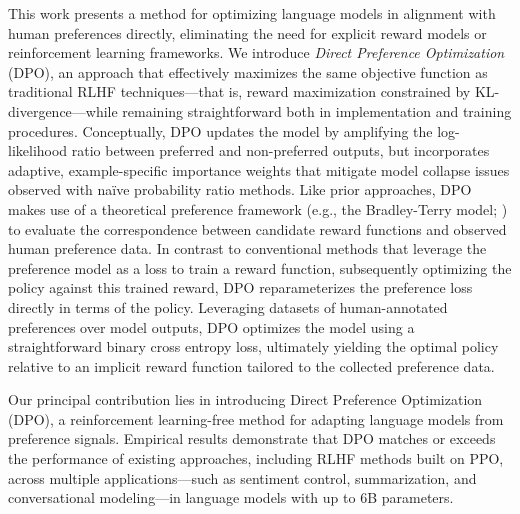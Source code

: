 This work presents a method for optimizing language models in alignment with human preferences directly, eliminating the need for explicit reward models or reinforcement learning frameworks. We introduce \textit{Direct Preference Optimization} (DPO), an approach that effectively maximizes the same objective function as traditional RLHF techniques—that is, reward maximization constrained by KL-divergence—while remaining straightforward both in implementation and training procedures. Conceptually, DPO updates the model by amplifying the log-likelihood ratio between preferred and non-preferred outputs, but incorporates adaptive, example-specific importance weights that mitigate model collapse issues observed with naïve probability ratio methods. Like prior approaches, DPO makes use of a theoretical preference framework (e.g., the Bradley-Terry model; \cite{bradley1952rankanalysis}) to evaluate the correspondence between candidate reward functions and observed human preference data. In contrast to conventional methods that leverage the preference model as a loss to train a reward function, subsequently optimizing the policy against this trained reward, DPO reparameterizes the preference loss directly in terms of the policy. Leveraging datasets of human-annotated preferences over model outputs, DPO optimizes the model using a straightforward binary cross entropy loss, ultimately yielding the optimal policy relative to an implicit reward function tailored to the collected preference data.

Our principal contribution lies in introducing Direct Preference Optimization (DPO), a reinforcement learning-free method for adapting language models from preference signals. Empirical results demonstrate that DPO matches or exceeds the performance of existing approaches, including RLHF methods built on PPO, across multiple applications—such as sentiment control, summarization, and conversational modeling—in language models with up to 6B parameters.


